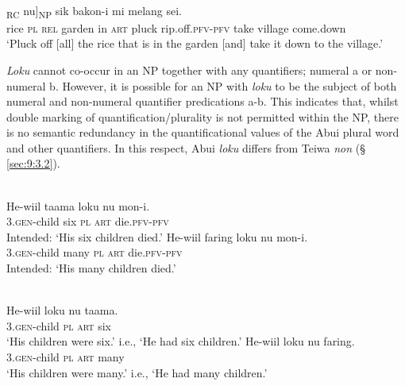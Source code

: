 \ea%
\label{ex:9:48}
 \\
\gll  [{Sieng} loku [{ba} uti {mia}]\textsubscript{RC} {nu}]\textsubscript{NP} sik bakon-i   mi melang sei. \\
   rice \textsc{pl} \textsc{rel} garden in \textsc{art} pluck rip.off.\textsc{pfv-pfv}   take village come.down \\
\glt `Pluck off [all] the rice that is in the garden [and] take it down to the village.'
\z

 




\textit{Loku} cannot co-occur in an NP together with any quantifiers; numeral a or non-numeral b. However, it is possible for an NP with \textit{loku} to be the subject of both numeral and non-numeral quantifier predications a-b. This indicates that, whilst double marking of quantification/plurality is not permitted within the NP, there is no semantic redundancy in the quantificational values of the Abui plural word and other quantifiers. In this respect, Abui \textit{loku} differs from Teiwa \textit{non} ({\S} \ref{sec:9:3.2}).


\ea%
\label{ex:9:49}
 \\
\ea
\gll *He-wiil taama loku nu mon-i.\\
   \textsc{3.gen}-child six \textsc{pl} \textsc{art} die.\textsc{pfv}-\textsc{pfv} \\
\glt Intended: `His six children died.'
\ex
\gll *He-wiil faring loku nu mon-i.\\
 \textsc{3.gen}-child many \textsc{pl} \textsc{art} die.\textsc{pfv}-\textsc{pfv}   \\
\glt  Intended: `His many children died.'
\z
\z





\ea%
\label{ex:9:50}
 \\
\ea
\gll  He-wiil loku nu {taama.}\\
  \textsc{3.gen}-child \textsc{pl} \textsc{art} six  \\
\glt `His children were six.' i.e., `He had six children.'
\ex
\gll He-wiil loku nu faring. \\
 \textsc{3.gen}-child \textsc{pl} \textsc{art} many   \\
\glt  `His children were many.' i.e., `He had many children.'
\z
\z







